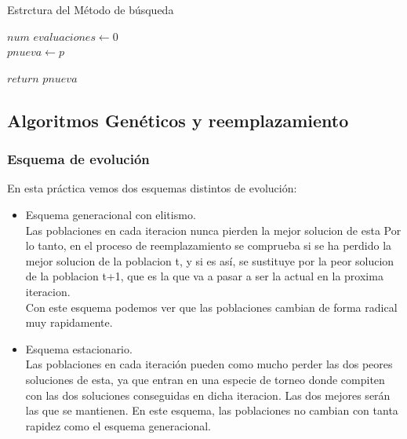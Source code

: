 \documentclass{article}
\begin{document}
\begin{algorithm}[H]
  \scriptsize
  \label{Estrctura del Metodo de búuqueda}
  \caption{Estrctura del Método de búsqueda}
\vspace{3mm}
$num$ $evaluaciones \leftarrow 0 $\\
$pnueva \leftarrow p $\\

$return$ $pnueva $\\
\end{algorithm}

\subsection{\normalsize Algoritmos Genéticos y reemplazamiento}
\subsubsection{\small Esquema de evolución}
En esta práctica vemos dos esquemas distintos de evolución:
\begin{itemize}
\item Esquema generacional con elitismo. \\
Las poblaciones en cada iteracion nunca pierden la mejor solucion de esta
Por lo tanto, en el proceso de reemplazamiento se comprueba si se ha perdido la mejor
solucion de la poblacion t, y si es así, se sustituye por la peor solucion de la poblacion 
t+1, que es la que va a pasar a ser la actual en la proxima iteracion.\\
Con este esquema podemos ver que las poblaciones cambian de forma radical muy rapidamente.
\item Esquema estacionario. \\
Las poblaciones en cada iteración pueden como mucho perder las dos peores 
soluciones de esta, ya que entran en una especie de torneo donde compiten con las dos 
soluciones conseguidas en dicha iteracion. Las dos mejores serán las que se mantienen.
En este esquema, las poblaciones no cambian con tanta rapidez como el esquema generacional.
\end{itemize}
\end{document}
